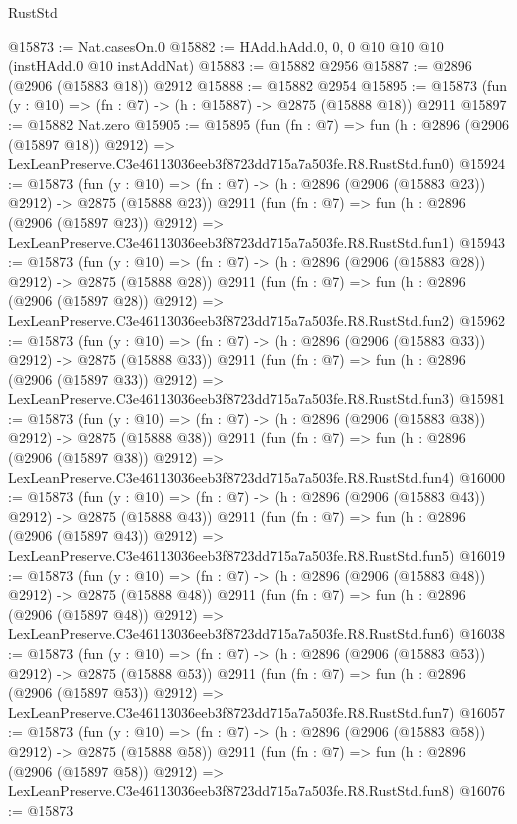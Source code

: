 \begin{lexlean}{RustStd}
\begin{coremodule}
@15873 := Nat.casesOn.{0}
@15882 := HAdd.hAdd.{0, 0, 0} @10 @10 @10 (instHAdd.{0} @10 instAddNat)
@15883 := @15882 @2956
@15887 := @2896 (@2906 (@15883 @18)) @2912
@15888 := @15882 @2954
@15895 := @15873 (fun (y : @10) => (fn : @7) -> (h : @15887) -> @2875 (@15888 @18)) @2911
@15897 := @15882 Nat.zero
@15905 := @15895
    (fun (fn : @7) =>
    fun (h : @2896 (@2906 (@15897 @18)) @2912) =>
    LexLeanPreserve.C3e46113036eeb3f8723dd715a7a503fe.R8.RustStd.fun0)
@15924 := @15873
    (fun (y : @10) => (fn : @7) -> (h : @2896 (@2906 (@15883 @23)) @2912) -> @2875 (@15888 @23))
    @2911
    (fun (fn : @7) =>
    fun (h : @2896 (@2906 (@15897 @23)) @2912) =>
    LexLeanPreserve.C3e46113036eeb3f8723dd715a7a503fe.R8.RustStd.fun1)
@15943 := @15873
    (fun (y : @10) => (fn : @7) -> (h : @2896 (@2906 (@15883 @28)) @2912) -> @2875 (@15888 @28))
    @2911
    (fun (fn : @7) =>
    fun (h : @2896 (@2906 (@15897 @28)) @2912) =>
    LexLeanPreserve.C3e46113036eeb3f8723dd715a7a503fe.R8.RustStd.fun2)
@15962 := @15873
    (fun (y : @10) => (fn : @7) -> (h : @2896 (@2906 (@15883 @33)) @2912) -> @2875 (@15888 @33))
    @2911
    (fun (fn : @7) =>
    fun (h : @2896 (@2906 (@15897 @33)) @2912) =>
    LexLeanPreserve.C3e46113036eeb3f8723dd715a7a503fe.R8.RustStd.fun3)
@15981 := @15873
    (fun (y : @10) => (fn : @7) -> (h : @2896 (@2906 (@15883 @38)) @2912) -> @2875 (@15888 @38))
    @2911
    (fun (fn : @7) =>
    fun (h : @2896 (@2906 (@15897 @38)) @2912) =>
    LexLeanPreserve.C3e46113036eeb3f8723dd715a7a503fe.R8.RustStd.fun4)
@16000 := @15873
    (fun (y : @10) => (fn : @7) -> (h : @2896 (@2906 (@15883 @43)) @2912) -> @2875 (@15888 @43))
    @2911
    (fun (fn : @7) =>
    fun (h : @2896 (@2906 (@15897 @43)) @2912) =>
    LexLeanPreserve.C3e46113036eeb3f8723dd715a7a503fe.R8.RustStd.fun5)
@16019 := @15873
    (fun (y : @10) => (fn : @7) -> (h : @2896 (@2906 (@15883 @48)) @2912) -> @2875 (@15888 @48))
    @2911
    (fun (fn : @7) =>
    fun (h : @2896 (@2906 (@15897 @48)) @2912) =>
    LexLeanPreserve.C3e46113036eeb3f8723dd715a7a503fe.R8.RustStd.fun6)
@16038 := @15873
    (fun (y : @10) => (fn : @7) -> (h : @2896 (@2906 (@15883 @53)) @2912) -> @2875 (@15888 @53))
    @2911
    (fun (fn : @7) =>
    fun (h : @2896 (@2906 (@15897 @53)) @2912) =>
    LexLeanPreserve.C3e46113036eeb3f8723dd715a7a503fe.R8.RustStd.fun7)
@16057 := @15873
    (fun (y : @10) => (fn : @7) -> (h : @2896 (@2906 (@15883 @58)) @2912) -> @2875 (@15888 @58))
    @2911
    (fun (fn : @7) =>
    fun (h : @2896 (@2906 (@15897 @58)) @2912) =>
    LexLeanPreserve.C3e46113036eeb3f8723dd715a7a503fe.R8.RustStd.fun8)
@16076 := @15873

\end{coremodule}
\end{lexlean}
